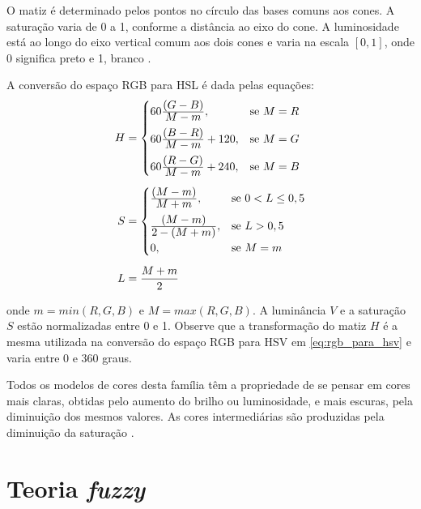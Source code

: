 O matiz é determinado pelos pontos no círculo das bases comuns aos cones. A saturação varia de 0 a 1, conforme a distância ao eixo do cone. A luminosidade está ao longo do eixo vertical comum aos dois cones e varia na escala $[0, 1]$, onde 0 significa preto e 1, branco \citep{pedrini:08}.

A conversão do espaço RGB para HSL é dada pelas equações:
\begin{align}
\label{eq:rgb_para_hsl}
\begin{split}
  H &=  \begin{cases}
            60\frac{\displaystyle (G - B)}{\displaystyle M - m}, & \text{se}\ M = R\\[0.7em]
            60\frac{\displaystyle (B - R)}{\displaystyle M - m} + 120, & \text{se}\ M = G\\[0.7em]
            60\frac{\displaystyle (R - G)}{\displaystyle M - m} + 240, & \text{se}\ M = B
       \end{cases}
  \\[0.5em]
  S &=  \begin{cases}
            \frac{\displaystyle (M - m)}{\displaystyle M + m}, & \text{se}\ 0 < L \leq 0,5\\[0.7em]
            \frac{\displaystyle (M - m)}{\displaystyle 2 - (M + m)}, & \text{se}\ L > 0,5\\[0.5em]
            0, & \text{se}\ M = m\\
       \end{cases}
  \\[0.5em]
  L &= \frac{M + m}{2}
\end{split}
\end{align}

\noindent onde $m = min(R, G ,B)$ e $M = max(R, G ,B)$. A luminância $V$ e a saturação $S$ estão normalizadas entre 0 e 1. Observe que a transformação do matiz $H$ é a mesma utilizada na conversão do espaço RGB para HSV em \ref{eq:rgb_para_hsv} e varia entre 0 e 360 graus.

Todos os modelos de cores desta família têm a propriedade de se pensar em cores mais claras, obtidas pelo aumento do brilho ou luminosidade, e mais escuras, pela diminuição dos mesmos valores. As cores intermediárias são produzidas pela diminuição da saturação \citep{pedrini:08}.

\section{Teoria \emph{fuzzy}}
\label{sec:teoria_fuzzy}

